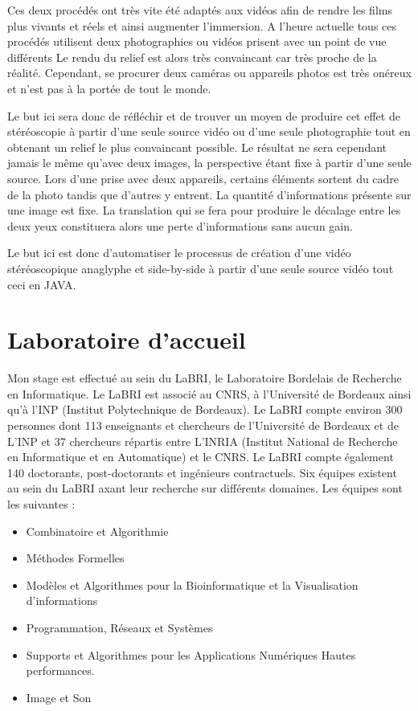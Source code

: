 \documentclass[10pt,a4paper]{article}
\begin{document}
Ces deux procédés ont très vite été adaptés aux vidéos afin de rendre les films plus vivants et réels et ainsi augmenter l'immersion.
A l'heure actuelle tous ces procédés utilisent deux photographies ou vidéos prisent avec un point de vue différents  Le rendu du relief est alors très convaincant car très proche de la réalité.
Cependant, se procurer deux caméras ou appareils photos est très onéreux et n'est pas à la portée de tout le monde. 

Le but ici sera donc de réfléchir et de trouver un moyen de produire cet effet de stéréoscopie à partir d'une seule source vidéo ou d'une seule photographie tout en obtenant un relief le plus convaincant possible. Le résultat ne sera cependant jamais le même qu'avec deux images,
la perspective étant fixe à partir d'une seule source. Lors d'une prise avec deux appareils, certains éléments sortent du cadre de la photo tandis que d'autres y entrent. La quantité d'informations présente sur une image est fixe. La translation qui se fera pour produire le décalage entre les deux yeux constituera alors une perte d'informations sans aucun gain.

Le but ici est donc d'automatiser le processus de création d'une vidéo stéréoscopique anaglyphe et side-by-side à partir d'une seule source vidéo tout ceci en JAVA.

\section{Laboratoire d'accueil}

Mon stage est effectué au sein du LaBRI, le Laboratoire Bordelais de Recherche en Informatique. Le LaBRI est associé au CNRS, à l'Université de Bordeaux ainsi qu'à l'INP (Institut Polytechnique de Bordeaux)\cite{labri}.
Le LaBRI compte environ 300 personnes dont 113 enseignants et chercheurs de l'Université de Bordeaux et de L'INP et 37 chercheurs répartis entre L'INRIA (Institut National de Recherche en Informatique et en Automatique) et le CNRS. Le LaBRI compte également 140 doctorants, post-doctorants et ingénieurs contractuels.
Six équipes existent au sein du LaBRI axant leur recherche sur différents domaines. Les équipes sont les suivantes :\\

\begin{itemize}
\item Combinatoire et Algorithmie
\item Méthodes Formelles
\item Modèles et Algorithmes pour la Bioinformatique et la Visualisation d'informations
\item Programmation, Réseaux et Systèmes
\item Supports et Algorithmes pour les Applications Numériques Hautes performances.
\item Image et Son\\
\end{itemize}
\end{document}
